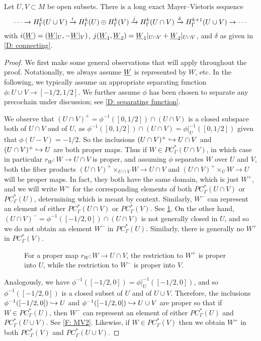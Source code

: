 \begin{theorem}\label{T: absolute MV}
	Let $U,V \subset M$ be open subsets.
	There is a long exact Mayer--Vietoris sequence
	\[
	\cdots \to H^k_\Gamma(U \cup V) \xrightarrow{i} H^k_\Gamma(U) \oplus H^k_\Gamma(V) \xrightarrow{j} H^k_\Gamma(U \cap V) \xrightarrow{\delta} H^{k+1}_\Gamma(U \cup V)\to\cdots
	\]
	with $i(\underline{W}) = (\underline{W}|_U, -\underline{W}|_V)$, $j(\underline{W}_1,\underline{W}_2) = \underline{W}_1|_{U \cap V}+\underline{W}_2|_{U \cap V}$, and $\delta$ as given in \cref{D: connecting}.
\end{theorem}

\begin{proof}
	We first make some general observations that will apply throughout the proof.
	Notationally, we always assume $\underline{W}$ is represented by $W$, etc.
	In the following, we typically assume an appropriate separating function $\phi \colon U \cup V \to [-1/2,1/2]$.
	We further assume $\phi$ has been chosen to separate any precochain under discussion;
	see \cref{D: separating function}.


	We observe that $(U \cap V)^+ = \phi^{-1}([0,1/2])\cap(U \cap V)$ is a closed subspace both of $U \cap V$ and of $U$, as $\phi^{-1}([0,1/2]) \cap (U \cap V) = \phi|_U^{-1}([0,1/2])$ given that $\phi(U - V) = -1/2$.
	So the inclusions $(U \cap V)^+ \hookrightarrow U \cap V$ and $(U \cap V)^+ \hookrightarrow U$ are both proper maps.
	Thus if $W \in PC^*_\Gamma(U \cap V)$, in which case in particular $r_W \colon W \to U \cap V$ is proper, and assuming $\phi$ separates $W$ over $U$ and $V$, both the fiber products $(U \cap V)^+\times_{U \cap V} W \to U \cap V$ and $(U \cap V)^+\times_{U} W \to U$ will be proper maps.
	In fact, they both have the same domain, which is just $W^+$, and we will write $W^+$ for the corresponding elements of both $PC^*_\Gamma(U \cap V)$ or $PC^*_\Gamma(U)$, determining which is meant by context.
	Similarly, $W^-$ can represent an element of either $PC^*_\Gamma(U \cap V)$ or $PC^*_\Gamma(V)$.
	See \cref{F: MV1}.
	On the other hand, $(U \cap V)^- = \phi^{-1}([-1/2,0])\cap(U \cap V)$ is not generally closed in $U$, and so we do not obtain an element $W^-$ in $PC^*_\Gamma(U)$.
	Similarly, there is generally no $W^+$ in $PC^*_\Gamma(V)$.

	\begin{figure}[h]
		
		\caption{For a proper map $r_W \colon W \to U \cap V$, the restriction to $W^+$ is proper into $U$, while the restriction to $W^-$ is proper into $V$.}
		\label{F: MV1}
	\end{figure}

	Analogously, we have $\phi^{-1}([-1/2,0]) = \phi|_U^{-1}([-1/2,0])$, and so $\phi^{-1}([-1/2,0])$ is a closed subset of $U$ and of $U \cup V$.
	Therefore, the inclusions $\phi^{-1}([-1/2,0]) \hookrightarrow U$ and $\phi^{-1}([-1/2,0]) \hookrightarrow U \cup V$ are proper so that if $W \in PC^*_\Gamma(U)$, then $W^-$ can represent an element of either $PC^*_\Gamma(U)$ and $PC^*_\Gamma(U \cup V)$.
	See \cref{F: MV2}.
	Likewise, if $W \in PC^*_\Gamma(V)$ then we obtain $W^+$ in both $PC^*_\Gamma(V)$ and $PC^*_\Gamma(U \cup V)$.


\end{proof}
